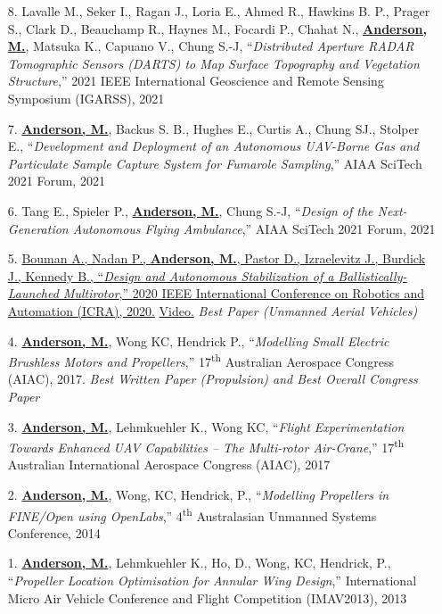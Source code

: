\documentclass[12pt,letter,sans]{moderncv}        %
\begin{document}
\begin{itemize}
    \item [8.] Lavalle M., Seker I., Ragan J., Loria E., Ahmed R., Hawkins B. P., Prager S., Clark D., Beauchamp R., Haynes M., Focardi P., Chahat N., \underline{\textbf{Anderson, M.}}, Matsuka K., Capuano V., Chung S.-J, ``\textit{Distributed Aperture RADAR Tomographic Sensors (DARTS) to Map Surface Topography and Vegetation Structure},'' 2021 IEEE International Geoscience and Remote Sensing Symposium (IGARSS), 2021
    
    \item [7.] \underline{\textbf{Anderson, M.}}, Backus S. B., Hughes E., Curtis A., Chung SJ., Stolper E., ``\textit{Development and Deployment of an Autonomous UAV-Borne Gas and Particulate Sample Capture System for Fumarole Sampling},'' AIAA SciTech 2021 Forum, 2021

    \item [6.] Tang E., Spieler P., \underline{\textbf{Anderson, M.}}, Chung S.-J, ``\textit{Design of the Next-Generation Autonomous Flying Ambulance},'' AIAA SciTech 2021 Forum, 2021
    
    \item [5.] \href{https://arxiv.org/pdf/1911.10269}
    {Bouman A., Nadan P., \underline{\textbf{Anderson, M.}}, Pastor D., Izraelevitz J., Burdick J., Kennedy B., ``\textit{Design and Autonomous Stabilization of a Ballistically-Launched Multirotor},'' 2020 IEEE International Conference on Robotics and Automation (ICRA), 2020.}
    \href{https://www.youtube.com/watch?v=VVgcsRmd8F0}{Video.}
    \textit{Best Paper (Unmanned Aerial Vehicles)}
    
    \item [4.] \underline{\textbf{Anderson, M.}}, Wong KC, Hendrick P., ``\textit{Modelling Small Electric Brushless Motors and Propellers},'' 17\textsuperscript{th} Australian Aerospace Congress (AIAC), 2017. \textit{Best Written Paper (Propulsion) and Best Overall Congress Paper}
    
    \item [3.] \underline{\textbf{Anderson, M.}}, Lehmkuehler K., Wong KC, ``\textit{Flight Experimentation Towards Enhanced UAV Capabilities -- The Multi-rotor Air-Crane},'' 17\textsuperscript{th} Australian International Aerospace Congress (AIAC), 2017
    
    \item [2.] \underline{\textbf{Anderson, M.}}, Wong, KC, Hendrick, P., ``\textit{Modelling Propellers in FINE/Open using OpenLabs},'' 4\textsuperscript{th} Australasian Unmanned Systems Conference, 2014
    
    \item [1.] \underline{\textbf{Anderson, M.}}, Lehmkuehler K., Ho, D., Wong, KC, Hendrick, P., ``\textit{Propeller Location Optimisation for Annular Wing Design},'' International Micro Air Vehicle Conference and Flight Competition (IMAV2013), 2013
    
\end{itemize}
\end{document}
